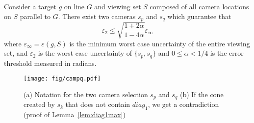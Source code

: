 \begin{theorem}\label{thrm:opt2cameras2dbound}
Consider a target $g$ on line $G$ and viewing set $S$ composed of all camera locations on $S$ parallel to $G$.
There exist two cameras $s_p$ and $s_q$ which guarantee that
\begin{equation}\label{eq:opt2cameras2dbound}
\varepsilon_2 \leq \sqrt{\frac{1+2\alpha}{1-4\alpha}}  \varepsilon_\infty
\end{equation}
where $\varepsilon_\infty = \varepsilon(g,S)$  is the minimum worst case uncertainty of the entire viewing set, and 
$\varepsilon_2$ is the worst case uncertainty of  $\{s_p, s_q \}$ and $0 \leq \alpha < 1/4$ is the error threshold measured in radians.
%
\end{theorem}



\begin{figure}[h]
\centering
	\texttt{[image: fig/campq.pdf]}
	\caption{(a) Notation for the two camera selection $s_p$ and $s_q$ (b) If the cone created by $s_k$ that does not contain $diag_1$, we get a contradiction (proof of Lemma~\ref{lem:diag1max})}
	\label{fig:campq}
\end{figure} 

